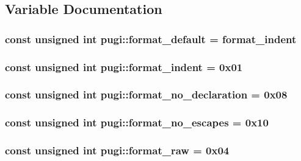 \subsection{Variable Documentation}
\hypertarget{namespacepugi_a325f48a35abbaeacdfd8b7fc9ed1713c}{
\subsubsection[{format\-\_\-default}]{\setlength{\rightskip}{0pt plus 5cm}const unsigned int pugi\-::format\-\_\-default = {\bf format\-\_\-indent}}}\label{namespacepugi_a325f48a35abbaeacdfd8b7fc9ed1713c}
\hypertarget{namespacepugi_ace12e8dee65c5bae8ee42a64be7421d3}{
\subsubsection[{format\-\_\-indent}]{\setlength{\rightskip}{0pt plus 5cm}const unsigned int pugi\-::format\-\_\-indent = 0x01}}\label{namespacepugi_ace12e8dee65c5bae8ee42a64be7421d3}
\hypertarget{namespacepugi_a0ec33e4db09260718f7003ed091f5a1b}{
\subsubsection[{format\-\_\-no\-\_\-declaration}]{\setlength{\rightskip}{0pt plus 5cm}const unsigned int pugi\-::format\-\_\-no\-\_\-declaration = 0x08}}\label{namespacepugi_a0ec33e4db09260718f7003ed091f5a1b}
\hypertarget{namespacepugi_ae8d833b4cabc60ba64536d57669454fd}{
\subsubsection[{format\-\_\-no\-\_\-escapes}]{\setlength{\rightskip}{0pt plus 5cm}const unsigned int pugi\-::format\-\_\-no\-\_\-escapes = 0x10}}\label{namespacepugi_ae8d833b4cabc60ba64536d57669454fd}
\hypertarget{namespacepugi_a2dd811716b1c0a6a2431ceca43bc649e}{
\subsubsection[{format\-\_\-raw}]{\setlength{\rightskip}{0pt plus 5cm}const unsigned int pugi\-::format\-\_\-raw = 0x04}}\label{namespacepugi_a2dd811716b1c0a6a2431ceca43bc649e}
